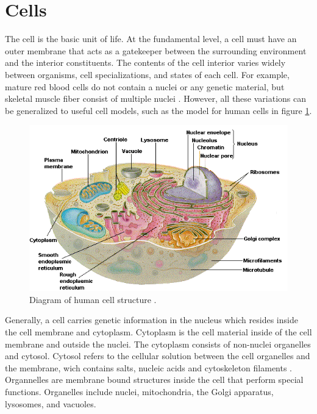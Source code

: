 

\section{Cells}
\par The cell is the basic unit of life. At the fundamental level, a cell must have an outer membrane that acts as a gatekeeper between the surrounding environment and the interior constituents. The contents of the cell interior varies widely between organisms, cell specializations, and states of each cell. For example, mature red blood cells do not contain a nuclei or any genetic material, but skeletal muscle fiber consist of multiple nuclei \cite{daniel_d_chiras_human_2005}. However, all these variations can be generalized to useful cell models, such as the model for human cells in figure \ref{fig:human_cell_model}.   
\begin{figure}[ht]
 \centering
 \includegraphics[width=\textwidth]{images/humanCellOverview.png}
 \caption[Diagram of human cell structure.]{Diagram of human cell structure \cite{daniel_d_chiras_human_2005}. }
 \label{fig:human_cell_model}
 \end{figure}
 
 \par Generally, a cell carries genetic information in the nucleus which resides inside the cell membrane and cytoplasm. Cytoplasm is the cell material inside of the cell membrane and outside the nuclei. The cytoplasm consists of non-nuclei organelles and cytosol.  Cytosol refers to the cellular solution between the cell organelles and the membrane, wich contains salts, nucleic acids and cytoskeleton filaments \cite{daniel_d_chiras_human_2005}. Organnelles are membrane bound structures inside the cell that perform special functions. Organelles include nuclei, mitochondria, the Golgi apparatus, lysosomes, and vacuoles.  
 
